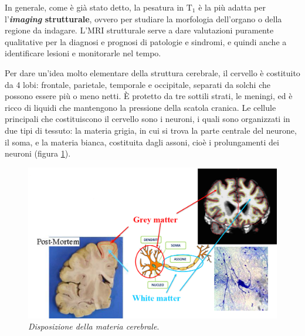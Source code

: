 \documentclass{report}
\newcommand{\figref}[1]{figura \ref{#1}}
\numberwithin{equation}{section}
\numberwithin{figure}{section}
\begin{document}
In generale, come è già stato detto, la pesatura in $\mathrm{T_1}$ è la più adatta per l'\textbf{\textit{imaging} strutturale}, ovvero per studiare la morfologia dell'organo o della regione da indagare. L'MRI strutturale serve a dare valutazioni puramente qualitative per la diagnosi e prognosi di patologie e sindromi, e quindi anche a identificare lesioni e monitorarle nel tempo.

Per dare un'idea molto elementare della struttura cerebrale, il cervello è costituito da 4 lobi: frontale, parietale, temporale e occipitale, separati da solchi che possono essere più o meno netti. È protetto da tre sottili strati, le meningi, ed è ricco di liquidi che mantengono la pressione della scatola cranica. Le cellule principali che costituiscono il cervello sono i neuroni, i quali sono organizzati in due tipi di tessuto: la materia grigia, in cui si trova la parte centrale del neurone, il soma, e la materia bianca, costituita dagli assoni, cioè i prolungamenti dei neuroni (\figref{fig:struttura}).

\begin{figure}[htp]
\centering
\includegraphics[scale=0.6]{immagini/struttura.png}
\caption{\label{fig:struttura} \textit{Disposizione della materia cerebrale}.}
\end{figure}
\end{document}
